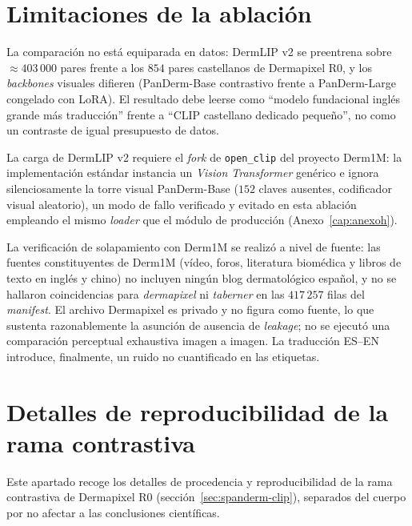 \section{Limitaciones de la ablación}
\label{sec:anexoi-limitaciones}

La comparación no está equiparada en datos: DermLIP v2 se
preentrena sobre $\approx 403\,000$ pares frente a los $854$ pares
castellanos de Dermapixel R0, y los \emph{backbones} visuales
difieren (PanDerm-Base contrastivo frente a PanDerm-Large
congelado con LoRA). El resultado debe leerse como ``modelo
fundacional inglés grande más traducción'' frente a ``CLIP
castellano dedicado pequeño'', no como un contraste de igual
presupuesto de datos.

La carga de DermLIP v2 requiere el \emph{fork} de
\texttt{open\_clip} del proyecto Derm1M: la implementación estándar
instancia un \emph{Vision Transformer} genérico e ignora
silenciosamente la torre visual PanDerm-Base ($152$ claves
ausentes, codificador visual aleatorio), un modo de fallo
verificado y evitado en esta ablación empleando el mismo
\emph{loader} que el módulo de producción
(Anexo~\ref{cap:anexoh}).

La verificación de solapamiento con Derm1M se realizó a nivel de
fuente: las fuentes constituyentes de Derm1M (vídeo, foros,
literatura biomédica y libros de texto en inglés y chino) no
incluyen ningún blog dermatológico español, y no se hallaron
coincidencias para \emph{dermapixel} ni \emph{taberner} en las
$417\,257$ filas del \emph{manifest}. El archivo Dermapixel es
privado y no figura como fuente, lo que sustenta razonablemente la
asunción de ausencia de \emph{leakage}; no se ejecutó una
comparación perceptual exhaustiva imagen a imagen. La traducción
ES--EN introduce, finalmente, un ruido no cuantificado en las
etiquetas.

\section{Detalles de reproducibilidad de la rama contrastiva}
\label{sec:anexoi-repro-contrastiva}

Este apartado recoge los detalles de procedencia y reproducibilidad
de la rama contrastiva de Dermapixel R0
(sección~\ref{sec:spanderm-clip}), separados del cuerpo por no
afectar a las conclusiones científicas.

